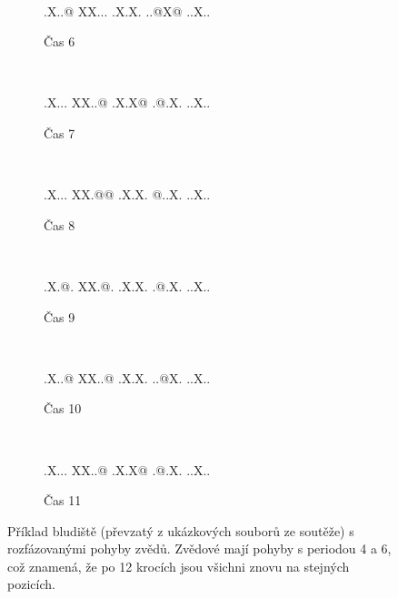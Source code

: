 \begin{figure}
\begin{subfigure}{0.12\textwidth}
  \end{subfigure}
  ~
  \begin{subfigure}{0.12\textwidth}
    \begin{bansheecastle}
 .X..@
 XX...
 .X.X.
 ..@X@
 ..X..
    \end{bansheecastle}
    \caption{Čas 6}
    \label{fig:banshee-castle-example-step6}
  \end{subfigure}
  ~
  \begin{subfigure}{0.12\textwidth}
    \begin{bansheecastle}
 .X...
 XX..@
 .X.X@
 .@.X.
 ..X..
    \end{bansheecastle}
    \caption{Čas 7}
    \label{fig:banshee-castle-example-step7}
  \end{subfigure}
  ~
  \begin{subfigure}{0.12\textwidth}
    \begin{bansheecastle}
 .X...
 XX.@@
 .X.X.
 @..X.
 ..X..
    \end{bansheecastle}
    \caption{Čas 8}
    \label{fig:banshee-castle-example-step8}
  \end{subfigure}
  ~
  \begin{subfigure}{0.12\textwidth}
    \begin{bansheecastle}
 .X.@.
 XX.@.
 .X.X.
 .@.X.
 ..X..
    \end{bansheecastle}
    \caption{Čas 9}
    \label{fig:banshee-castle-example-step9}
  \end{subfigure}
  ~
  \begin{subfigure}{0.12\textwidth}
    \begin{bansheecastle}
 .X..@
 XX..@
 .X.X.
 ..@X.
 ..X..
    \end{bansheecastle}
    \caption{Čas 10}
    \label{fig:banshee-castle-example-step10}
  \end{subfigure}
  ~
  \begin{subfigure}{0.12\textwidth}
    \begin{bansheecastle}
 .X...
 XX..@
 .X.X@
 .@.X.
 ..X..
    \end{bansheecastle}
    \caption{Čas 11}
    \label{fig:banshee-castle-example-step11}
  \end{subfigure}

  \caption{Příklad bludiště (převzatý z ukázkových souborů ze soutěže) s
  rozfázovanými pohyby zvědů. Zvědové mají pohyby s periodou 4 a 6, což znamená,
  že po 12 krocích jsou všichni znovu na stejných pozicích.}
  \label{fig:banshee-castle-example}

\end{figure}
